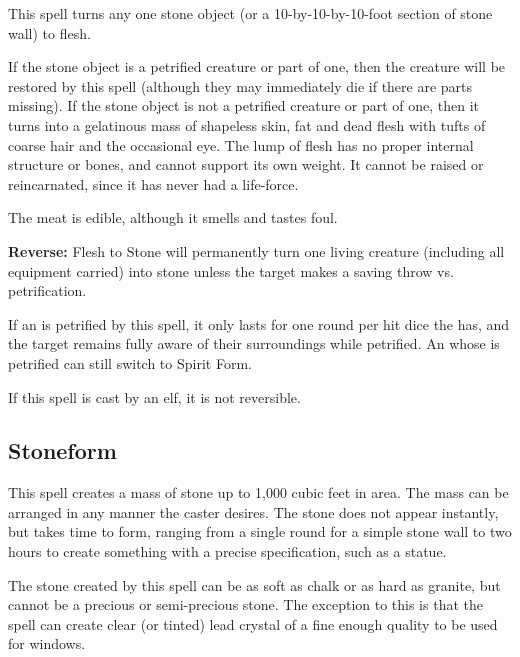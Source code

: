\begin{multicols*}{2}
This spell turns any one stone object (or a 10-by-10-by-10-foot section of stone wall) to flesh.

If the stone object is a petrified creature or part of one, then the creature will be restored by this spell (although they may immediately die if there are parts missing). If the stone object is not a petrified creature or part of one, then it turns into a gelatinous mass of shapeless skin, fat and dead flesh with tufts of coarse hair and the occasional eye. The lump of flesh has no proper internal structure or bones, and cannot support its own weight. It cannot be raised or reincarnated, since it has never had a life-force.

The meat is edible, although it smells and tastes foul.

\textbf{Reverse:} \hypertarget{spell:Flesh to Stone}{Flesh to Stone} will permanently turn one living creature (including all equipment carried) into stone unless the target makes a saving throw vs. petrification.

If an  is petrified by this spell, it only lasts for one round per hit dice the  has, and the target remains fully aware of their surroundings while petrified. An  whose  is petrified can still switch to Spirit Form.

If this spell is cast by an elf, it is not reversible.

\subsection{Stoneform}\label{spell:Stoneform}

This spell creates a mass of stone up to 1,000 cubic feet in area. The mass can be arranged in any manner the caster desires. The stone does not appear instantly, but takes time to form, ranging from a single round for a simple stone wall to two hours to create something with a precise specification, such as a statue.

The stone created by this spell can be as soft as chalk or as hard as granite, but cannot be a precious or semi-precious stone. The exception to this is that the spell can create clear (or tinted) lead crystal of a fine enough quality to be used for windows.


\end{multicols*}
